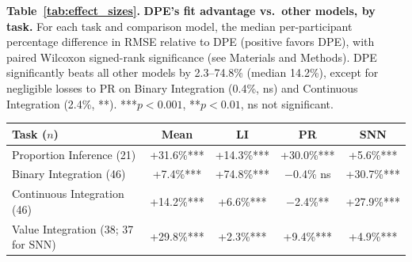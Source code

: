 \vspace{0.6em}
\noindent\begin{minipage}{\textwidth}\color{mscap}\scriptsize {\textbf{Table~\ref{tab:effect_sizes}.} \textbf{DPE's fit advantage vs.\ other models, by task.} For each task and comparison model, the median per-participant percentage difference in RMSE relative to DPE (positive favors DPE), with paired Wilcoxon signed-rank significance (see Materials and Methods). DPE significantly beats all other models by 2.3--74.8\% (median 14.2\%), except for negligible losses to PR on Binary Integration (0.4\%, ns) and Continuous Integration (2.4\%, **). ***$p<0.001$, **$p<0.01$, ns not significant.\par}
\vspace{0.4em}
\begin{center}
\begin{tabular}{lcccc}
		\hline
		Task ($n$) & Mean & LI & PR & SNN \\
		\hline
		Proportion Inference (21) & +31.6\%*** & +14.3\%*** & +30.0\%*** & +5.6\%*** \\
		Binary Integration (46) & +7.4\%*** & +74.8\%*** & $-$0.4\% ns & +30.7\%*** \\
		Continuous Integration (46) & +14.2\%*** & +6.6\%*** & $-$2.4\%** & +27.9\%*** \\
		Value Integration (38; 37 for SNN) & +29.8\%*** & +2.3\%*** & +9.4\%*** & +4.9\%*** \\
		\hline
	\end{tabular}
\end{center}
\end{minipage}
\vspace{0.8em}

